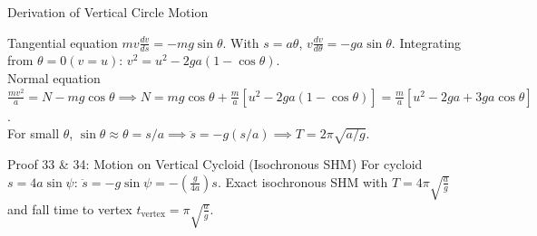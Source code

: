 \documentclass[11pt, a4paper]{report}
\begin{document}
\begin{proofbox}{Derivation of Vertical Circle Motion}
\begin{center}
\end{center}

Tangential equation $m v \frac{dv}{ds} = -mg \sin\theta$. With $s = a\theta$, $v \frac{dv}{d\theta} = -ga \sin\theta$. Integrating from $\theta=0 (v=u)$: $v^2 = u^2 - 2ga(1 - \cos\theta)$.\\
Normal equation $\frac{m v^2}{a} = N - mg \cos\theta \implies N = mg\cos\theta + \frac{m}{a}[u^2 - 2ga(1-\cos\theta)] = \frac{m}{a}[u^2 - 2ga + 3ga\cos\theta]$.\\
For small $\theta$, $\sin\theta \approx \theta = s/a \implies \ddot{s} = -g(s/a) \implies T = 2\pi\sqrt{a/g}$.
\end{proofbox}

\begin{theorembox}{Proof 33 \& 34: Motion on Vertical Cycloid (Isochronous SHM)}
For cycloid $s = 4a\sin\psi$: $\ddot{s} = -g\sin\psi = -\left(\frac{g}{4a}\right)s$.
Exact isochronous SHM with $T = 4\pi\sqrt{\frac{a}{g}}$ and fall time to vertex $t_{\text{vertex}} = \pi\sqrt{\frac{a}{g}}$.
\end{theorembox}
\end{document}
